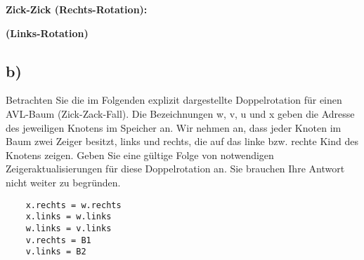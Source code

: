 \documentclass[a4paper]{article}
\begin{document}
\textbf{Zick-Zick (Rechts-Rotation):}\\


\textbf{(Links-Rotation)}


\subsection*{b)}
Betrachten Sie die im Folgenden explizit dargestellte Doppelrotation für einen AVL-Baum (Zick-Zack-Fall). Die Bezeichnungen w, v, u und x geben die Adresse des jeweiligen Knotens im Speicher an. Wir nehmen an, dass jeder Knoten im Baum zwei Zeiger besitzt, links und rechts, die auf das linke bzw. rechte Kind des Knotens zeigen. Geben Sie eine gültige Folge von notwendigen Zeigeraktualisierungen für diese Doppelrotation an. Sie brauchen Ihre Antwort nicht weiter zu begründen.

\begin{verbatim}
    x.rechts = w.rechts
    x.links = w.links
    w.links = v.links
    v.rechts = B1
    v.links = B2
\end{verbatim}
\end{document}
